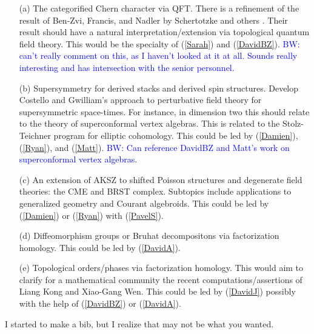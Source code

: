 \documentclass[11pt]{amsart}
\def\brian{\textcolor{blue}{BW: }\textcolor{blue}}
\begin{document}
\begin{itemize}
\item[(a)] The categorified Chern character via QFT.  There is a refinement of the result of Ben-Zvi, Francis, and Nadler by Schertotzke and others \cite{HSS}.  Their result should have a natural interpretation/extension via topological quantum field theory. This would be the specialty of (\ref{Sarah}) and (\ref{DavidBZ}).
\brian{can't really comment on this, as I haven't looked at it at all. Sounds really interesting and has intersection with the senior personnel.}
\item[(b)] Supersymmetry for derived stacks and derived spin structures. 
Develop Costello and Gwilliam's approach to perturbative field theory for supersymmetric space-times. For instance, in dimension two this should relate to the theory of superconformal vertex algebras. 
This is related to the Stolz-Teichner program for elliptic cohomology. 
This could be led by (\ref{Damien}), (\ref{Ryan}), and (\ref{Matt}). \brian{Can reference DavidBZ and Matt's work on superconformal vertex algebras}. 
\item[(c)] An extension of AKSZ to shifted Poisson structures and degenerate field theories: the CME and BRST complex. 
Subtopics include applications to generalized geometry and Courant algebroids. 
This could be led by (\ref{Damien}) or (\ref{Ryan}) with (\ref{PavelS}).
\item[(d)] Diffeomorphism groups or Bruhat decompositons via factorization homology. 
This could be led by (\ref{DavidA}).
\item[(e)] Topological orders/phases via factorization homology. 
This would aim to clarify for a mathematical community the recent computations/assertions of Liang Kong and Xiao-Gang Wen. 
This could be led by (\ref{DavidJ}) possibly with the help of (\ref{DavidBZ}) or (\ref{DavidA}).

\end{itemize}

I started to make a bib, but I realize that may not be what you wanted. 




\end{document}
